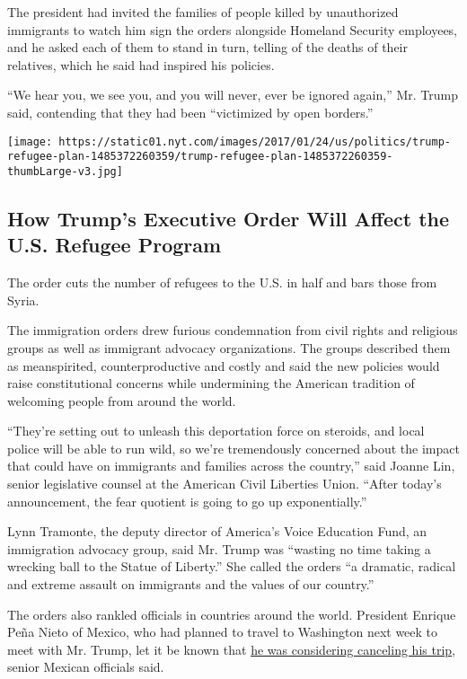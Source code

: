 The president had invited the families of people killed by unauthorized
immigrants to watch him sign the orders alongside Homeland Security
employees, and he asked each of them to stand in turn, telling of the
deaths of their relatives, which he said had inspired his policies.

``We hear you, we see you, and you will never, ever be ignored again,''
Mr. Trump said, contending that they had been ``victimized by open
borders.''

\href{https://www.nytimes.com/interactive/2017/01/25/us/politics/trump-refugee-plan.html}{}

\texttt{[image: https://static01.nyt.com/images/2017/01/24/us/politics/trump-refugee-plan-1485372260359/trump-refugee-plan-1485372260359-thumbLarge-v3.jpg]}

\hypertarget{how-trumps-executive-order-will-affect-the-us-refugee-program}{%
\subsection{How Trump's Executive Order Will Affect the U.S. Refugee
Program}\label{how-trumps-executive-order-will-affect-the-us-refugee-program}}

The order cuts the number of refugees to the U.S. in half and bars those
from Syria.

The immigration orders drew furious condemnation from civil rights and
religious groups as well as immigrant advocacy organizations. The groups
described them as meanspirited, counterproductive and costly and said
the new policies would raise constitutional concerns while undermining
the American tradition of welcoming people from around the world.

``They're setting out to unleash this deportation force on steroids, and
local police will be able to run wild, so we're tremendously concerned
about the impact that could have on immigrants and families across the
country,'' said Joanne Lin, senior legislative counsel at the American
Civil Liberties Union. ``After today's announcement, the fear quotient
is going to go up exponentially.''

Lynn Tramonte, the deputy director of America's Voice Education Fund, an
immigration advocacy group, said Mr. Trump was ``wasting no time taking
a wrecking ball to the Statue of Liberty.'' She called the orders ``a
dramatic, radical and extreme assault on immigrants and the values of
our country.''

The orders also rankled officials in countries around the world.
President Enrique Peña Nieto of Mexico, who had planned to travel to
Washington next week to meet with Mr. Trump, let it be known that
\href{https://www.nytimes.com/2017/01/25/world/americas/trump-mexico-border-wall.html}{he
was considering canceling his trip}, senior Mexican officials said.

